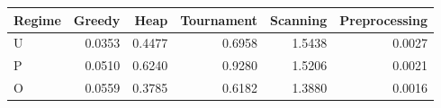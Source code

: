 \begin{tabular}{lrrrrr}\toprule
	Regime & Greedy & Heap & Tournament & Scanning & Preprocessing\\\midrule
	U & 0.0353 & 0.4477 & 0.6958 & 1.5438 & 0.0027\\
	P & 0.0510 & 0.6240 & 0.9280 & 1.5206 & 0.0021\\
	O & 0.0559 & 0.3785 & 0.6182 & 1.3880 & 0.0016\\
	\bottomrule
\end{tabular}
